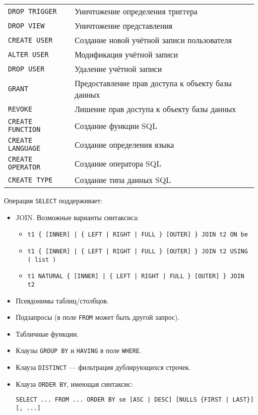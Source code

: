 \documentclass[a4paper,12pt,notitlepage,headsepline,pdftex]{scrartcl}
\begin{document}
\begin{table}[h]
\begin{tabular}[c]{l|l}
        \texttt{DROP TRIGGER} & Уничтожение определения триггера\\
        \texttt{DROP VIEW} & Уничтожение представления\\
        \texttt{CREATE USER} & Создание новой учётной записи пользователя\\
        \texttt{ALTER USER} & Модификация учётной записи\\
        \texttt{DROP USER} & Удаление учётной записи\\
        \texttt{GRANT} & Предоставление прав доступа к объекту базы данных\\
        \texttt{REVOKE} & Лишение прав доступа к объекту базы данных\\
        \texttt{CREATE FUNCTION} & Создание функции SQL\\
        \texttt{CREATE LANGUAGE} & Создание определения языка\\
        \texttt{CREATE OPERATOR} & Создание оператора SQL\\
        \texttt{CREATE TYPE} & Создание типа данных SQL\\
        \hline
      \end{tabular}
    \end{table}

    Операция \texttt{SELECT} поддерживает:
    \begin{itemize}
      \item JOIN.
        Возможные варианты синтаксиса:
        \begin{itemize}
          \item \verb't1 { [INNER] | { LEFT | RIGHT | FULL } [OUTER] } JOIN t2 ON be'
          \item \verb't1 { [INNER] | { LEFT | RIGHT | FULL } [OUTER] } JOIN t2 USING ( list )'
          \item \verb't1 NATURAL { [INNER] | { LEFT | RIGHT | FULL } [OUTER] } JOIN t2'
        \end{itemize}
      \item Псевдонимы таблиц/столбцов.
      \item Подзапросы (в поле \verb'FROM' может быть другой запрос).
      \item Табличные функции.
      \item Клаузы \verb'GROUP BY' и \verb'HAVING' в поле \verb'WHERE'.
      \item Клауза \verb'DISTINCT' --- фильтрация дублирующихся строчек.
      \item Клауза \verb'ORDER BY', имеющая синтаксис:

        \verb'SELECT ... FROM ... ORDER BY se [ASC | DESC] [NULLS {FIRST | LAST}] [, ...]'
    \end{itemize}
\end{document}
